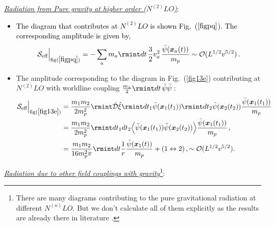\vspace{0.2 cm}
\underline{\textit{{Radiation from Pure  gravity at higher order ($N^{(2)}LO$)}}}:
\begin{itemize}
\item \textcolor{black}{The diagram that contributes at $N^{(2)}LO$ is shown Fig.~($\ref{figpq}$). The corresponding amplitude is given by,
\begin{align}
\begin{split}
\mathcal{S}_\text{eff}\Big |_{\text{fig}(\ref{figpq})}=-\sum_a m_a \rmint dt \,\frac{3}{2}v_a^2\,\frac{\Bar{\psi}(\boldsymbol{x}_a(t))}{m_p}\sim\mathcal{O}(L^{1/2}v^{5/2})\,.
\end{split}
\end{align}}
\item The amplitude corresponding to the diagram in Fig.~(\ref{fig13e}) contributing at $N^{(2)}LO$ with worldline coupling $\frac{m_a}{2}\rmint dt\,\tilde{\psi}\Bar{\psi} :$
\begin{align}
    \begin{split}
         \mathcal{S}_{\text{eff}}\Big |_{\text{fig}(\ref{fig13e})}&=\frac{m_1m_2}{2m_p^2}\rmint \Bar{\mathcal{D}}\hat{\xi}\rmint dt_1 \Tilde{\psi}(\boldsymbol{x}_1(t_1))\rmint dt_2\Tilde{\psi}(\boldsymbol{x}_2(t_2))\frac{\Bar{\psi}(\boldsymbol{x}_1(t_1))}{m_p}\,\\&
         =\frac{m_1m_2}{2m_p^2}\rmint dt_1 dt_2 \Big{\langle}\tilde{\psi}(\boldsymbol{x}_1(t_1))\Tilde{\psi}(\boldsymbol{x}_2(t_2))\Big{\rangle}\frac{\Bar{\psi}(\boldsymbol{x}_1(t_1))}{m_p}\,,\\&
      =\frac{m_1m_2}{16m_p^2\pi}\rmint dt\frac{1}{r}\frac{\Bar{\psi}(\boldsymbol{x}_1(t))}{m_p}+(1\leftrightarrow 2)\,,\sim\mathcal{O}(L^{1/2}v^{5/2}).
    \end{split}
\end{align}
\end{itemize}
\underline{\textit{Radiation due to other field couplings with gravity}}\footnote{There are many diagrams contributing to the pure gravitational radiation at different $N^{(n)}LO$. But we don't calculate all of them explicitly as the results are already there in literature \cite{Blanchet:2013haa}.}:

